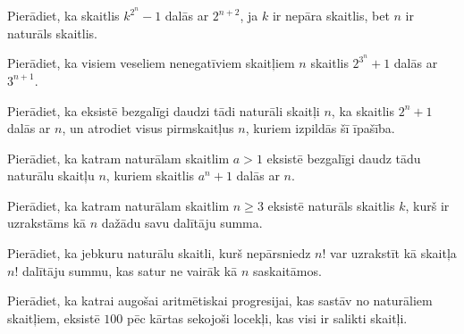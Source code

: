 \documentclass[a4paper,12pt]{article}
\begin{document}
\vspace{10pt}
\begin{problem}
Pierādiet, ka skaitlis $k^{2^n}-1$ dalās ar $2^{n+2}$, 
ja $k$ ir nepāra skaitlis, bet $n$ ir naturāls skaitlis.
\end{problem}



\vspace{10pt}
\begin{problem}
Pierādiet, ka visiem veseliem nenegatīviem skaitļiem $n$ skaitlis $2^{3^n}+1$ dalās ar $3^{n+1}$.
\end{problem}



\vspace{10pt}
\begin{problem}
Pierādiet, ka eksistē bezgalīgi daudzi tādi naturāli skaitļi $n$, 
ka skaitlis $2^n+1$ dalās ar $n$, un atrodiet visus pirmskaitļus $n$, 
kuriem izpildās šī īpašība.
\end{problem}




\vspace{10pt}
\begin{problem}
Pierādiet, ka katram naturālam skaitlim $a>1$ eksistē bezgalīgi daudz tādu naturālu skaitļu $n$, 
kuriem skaitlis $a^n+1$ dalās ar $n$.
\end{problem}



\vspace{10pt}
\begin{problem}
Pierādiet, ka katram naturālam skaitlim $n \geq 3$ eksistē naturāls skaitlis $k$, 
kurš ir uzrakstāms kā $n$ dažādu savu dalītāju summa.
\end{problem}




\vspace{10pt}
\begin{problem}
Pierādiet, ka jebkuru naturālu skaitli, kurš nepārsniedz $n!$ 
var uzrakstīt kā skaitļa $n!$ dalītāju summu, kas satur ne vairāk kā $n$ saskaitāmos.
\end{problem}




\vspace{10pt}
\begin{problem}
Pierādiet, ka katrai augošai aritmētiskai progresijai, kas sastāv no na\-tu\-rā\-liem skaitļiem, 
eksistē $100$ pēc kārtas sekojoši locekļi, kas visi ir salikti skaitļi.
\end{problem}
\end{document}
